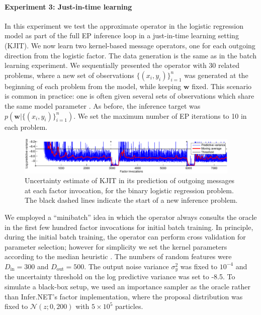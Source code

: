 \documentclass[english]{article}
\theoremstyle{plain}
\theoremstyle{plain}
\newcommand{\wjnote}[1]{ }
\begin{document}
\paragraph{Experiment 3: Just-in-time learning}
In this experiment we test the approximate operator in the logistic regression model as part of the full EP inference loop in a just-in-time learning setting (KJIT). %
We now learn two kernel-based message operators, one for each outgoing 
direction from the logistic factor. 
The data generation is the same as in the batch learning experiment.
We sequentially presented the operator with 30 related problems, where a new 
set of observations $\{(x_i, y_i)\}_{i=1}^n$ was generated at the beginning of 
each problem from the model, while keeping $\boldsymbol{w}$ fixed.
This scenario is common in practice: one is often given several sets of 
observations which share the same model parameter \citep{Eslami2014}. 
As before, the inference target was $p(\boldsymbol{w}|\{(x_i, y_i)\}_{i=1}^n)$.
We set the maximum number of EP iterations to 10 in each problem.

\begin{figure}[t]
\centering
\includegraphics[width=0.95\textwidth]{img/online/logistic_temporal_uncertainty-crop}
\caption{Uncertainty estimate of KJIT in its prediction of outgoing messages at each factor invocation,
for the binary logistic regression problem. The black dashed lines indicate the start 
of a new inference problem.
\label{fig:logistic_temporal_uncertainty}
}
\end{figure}


We employed a ``minibatch'' idea in which the operator always consults the oracle in
the first few hundred factor invocations for initial batch training. 
In principle, during the initial batch training, the operator can perform 
cross validation for parameter selection; however for simplicity we set the kernel 
parameters according to the median heuristic \citep{Scholkopf2002}. 
The numbers 
of random features were $D_\mathrm{in} = 300$ and $D_\mathrm{out} = 500$. The output noise variance 
$\sigma^2_y$ was fixed to $10^{-4}$ and the uncertainty threshold on the log 
predictive variance was set to -8.5. To simulate a black-box setup, we used
an importance sampler as the oracle rather than Infer.NET's factor implementation, 
where the proposal distribution was fixed to $\mathcal{N}(z; 0, 200)$ with 
$5 \times 10^5$ particles.
\end{document}
